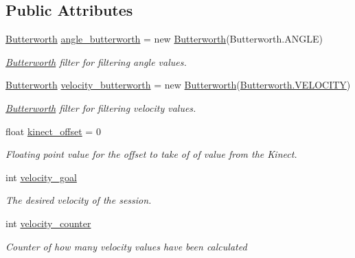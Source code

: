 \subsection*{Public Attributes}
\begin{DoxyCompactItemize}
\item 
\hyperlink{classkinect_expirement_1_1_butterworth}{Butterworth} \hyperlink{classkinect_expirement_1_1_kinect_form_abec90e6db4a70d6cccc38f90f800e3ab}{angle\+\_\+butterworth} = new \hyperlink{classkinect_expirement_1_1_butterworth}{Butterworth}(Butterworth.\+A\+N\+G\+LE)
\begin{DoxyCompactList}\small\item\em \hyperlink{classkinect_expirement_1_1_butterworth}{Butterworth} filter for filtering angle values. \end{DoxyCompactList}\item 
\hyperlink{classkinect_expirement_1_1_butterworth}{Butterworth} \hyperlink{classkinect_expirement_1_1_kinect_form_a7f1502bd90febb3137d8e4fdf71d52ec}{velocity\+\_\+butterworth} = new \hyperlink{classkinect_expirement_1_1_butterworth}{Butterworth}(\hyperlink{classkinect_expirement_1_1_butterworth_afc717929ffc8d554b7e0263e2b06806a}{Butterworth.\+V\+E\+L\+O\+C\+I\+TY})
\begin{DoxyCompactList}\small\item\em \hyperlink{classkinect_expirement_1_1_butterworth}{Butterworth} filter for filtering velocity values. \end{DoxyCompactList}\item 
float \hyperlink{classkinect_expirement_1_1_kinect_form_a97a0dd9256e1093328fafccaca672398}{kinect\+\_\+offset} = 0
\begin{DoxyCompactList}\small\item\em Floating point value for the offset to take of of value from the Kinect. \end{DoxyCompactList}\item 
int \hyperlink{classkinect_expirement_1_1_kinect_form_a6334825924ef2914544c0c96c0ad0572}{velocity\+\_\+goal}
\begin{DoxyCompactList}\small\item\em The desired velocity of the session. \end{DoxyCompactList}\item 
int \hyperlink{classkinect_expirement_1_1_kinect_form_aedd93118198e798ee966ff768038bac1}{velocity\+\_\+counter}
\begin{DoxyCompactList}\small\item\em Counter of how many velocity values have been calculated \end{DoxyCompactList}\end{DoxyCompactItemize}
